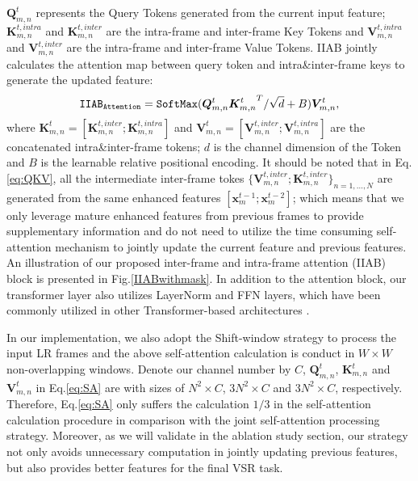 \documentclass[10pt,twocolumn,letterpaper]{article}
\begin{document}
$\bm{Q}_{m,n}^{t}$ represents the Query Tokens generated from the current input feature;
 $\bm{K}_{m,n}^{t, intra}$ and $\bm{K}_{m,n}^{t, inter}$ are the intra-frame and inter-frame Key Tokens and $\bm{V}_{m,n}^{t, intra}$ and $\bm{V}_{m,n}^{t, inter}$ are the intra-frame and inter-frame Value Tokens.
%
IIAB jointly calculates the attention map between query token and intra\&inter-frame keys to generate the updated feature:
\begin{equation}
\label{eq:SA}
\setlength\abovedisplayskip{1pt}
\setlength\belowdisplayskip{1pt}
      \texttt{IIAB}_\texttt{Attention} = \texttt{SoftMax}(\bm{Q}_{m,n}^{t}{\bm{K}_{m,n}^{t}}^T/\sqrt{d}+B)\bm{V}_{m,n}^{t},
\end{equation}
where $\bm{K}_{m,n}^{t} = [\bm{K}_{m,n}^{t,inter};\bm{K}_{m,n}^{t,intra}]$ and $\bm{V}_{m,n}^{t} = [\bm{V}_{m,n}^{t,inter};\bm{V}_{m,n}^{t,intra}]$ are the concatenated intra\&inter-frame tokens; $d$ is the channel dimension of the Token and $B$ is the learnable relative positional encoding.
%
It should be noted that in Eq.\ref{eq:QKV}, all the intermediate inter-frame tokes $\{\bm{V}_{m,n}^{t,inter};\bm{K}_{m,n}^{t,inter}\}_{n=1,\dots, N}$ are generated from the same enhanced features $\left[\bm{x}_{m}^{t-1}; \bm{x}_{m}^{t-2}\right]$;
which means that we only leverage mature enhanced features from previous frames to provide supplementary information and do not need to utilize the time consuming self-attention mechanism to jointly update the current feature and previous features.
%
An illustration of our proposed inter-frame and intra-frame attention (IIAB) block  is presented in Fig.\ref{IIABwithmask}.
%
 In addition to the attention block, our transformer layer also utilizes LayerNorm
and FFN layers, which have been commonly utilized in other Transformer-based architectures \cite{liang2022recurrent, shi2022rethinking}.


In our implementation, we also adopt the Shift-window strategy to process the input LR frames and the above self-attention calculation is conduct in $W\times W$ non-overlapping windows.
%
Denote our channel number by $C$, $\bm{Q}_{m,n}^{t}$, $\bm{K}_{m,n}^{t}$ and $\bm{V}_{m,n}^{t}$ in Eq.\ref{eq:SA} are with sizes of $N^2\times C$, $3N^2\times C$ and $3N^2\times C$, respectively. 
%
Therefore, Eq.\ref{eq:SA} only suffers the calculation $1/3$ in the self-attention calculation procedure in comparison with the joint self-attention processing strategy.
%
Moreover, as we will validate in the ablation study section, our strategy not only avoids unnecessary computation in jointly updating previous features, but also provides better features for the final VSR task.
%
\end{document}
